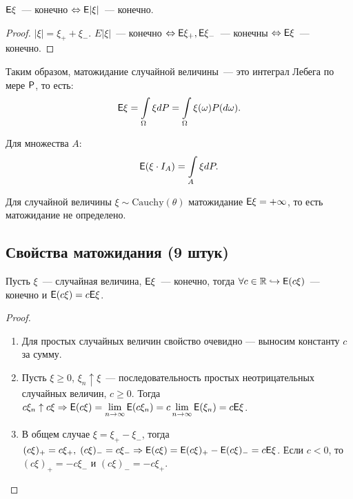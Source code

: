 \begin{consequence}
	$\E \xi$~--- конечно $\Leftrightarrow \E|\xi|$~--- конечно.
	\begin{proof}
		$|\xi| = \xi_+ + \xi_-$. $E|\xi|$~--- конечно $\Leftrightarrow \E\xi_+, \E\xi_-$~--- конечны $\Leftrightarrow \E\xi$~--- конечно.
	\end{proof}
\end{consequence}

\begin{statement}
    Таким образом, матожидание случайной величины~--- это интеграл Лебега по мере $\P$, то есть: $$ \E\xi = \int\limits_\Omega \xi dP = \int\limits_\Omega \xi(\omega)P(d\omega).$$

    Для множества $A$:
    $$ \E(\xi\cdot I_A) = \int\limits_A \xi dP. $$
\end{statement}

    Для случайной величины $\xi \sim \text{Cauchy}(\theta)$ матожидание $\E\xi = +\infty$, то есть матожидание не определено.

\subsection{Свойства матожидания (9 штук)}
\begin{property}
	Пусть $\xi$~--- случайная величина, $\E \xi$~--- конечно, тогда $\forall c \in \R \hookrightarrow \E(c\xi)$~--- конечно и $\E(c\xi) = c\E\xi$.
	\begin{proof}
	    \begin{enumerate}
    	    \item Для простых случайных величин свойство очевидно --- выносим константу $c$ за сумму. 
    		
    		\item Пусть $\xi \geqslant 0$, $\xi_n \uparrow \xi$~--- последовательность простых неотрицательных случайных величин, $c \geqslant 0$. Тогда $c\xi_n \uparrow c\xi \Rightarrow \E(c\xi) = \lim\limits_{n \rightarrow \infty} \E(c\xi_n) = c \lim\limits_{n \rightarrow \infty} \E(\xi_n) = c\E\xi$. 
    		
    		\item В общем случае $\xi = \xi_+ - \xi_-$, тогда $(c\xi)_+ = c\xi_+,\; (c\xi)_- = c\xi_- \Rightarrow \E(c\xi) = \E(c\xi)_+ - \E(c\xi)_- = c\E\xi$. Если $c < 0$, то $(c\xi)_+ = -c\xi_-$ и $(c\xi)_- = -c\xi_+$.
	    \end{enumerate}
	\end{proof}
\end{property}


